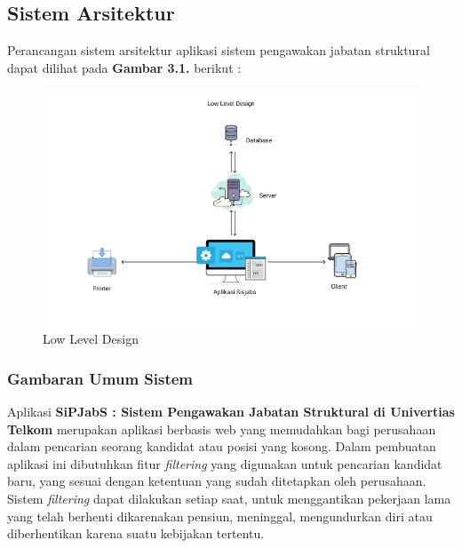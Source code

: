 \chapter{\babTiga}

\section{Sistem Arsitektur}

Perancangan sistem arsitektur aplikasi sistem pengawakan jabatan struktural dapat dilihat pada \textbf{Gambar 3.1.} berikut : 

\begin{figure}
	\centering
	\includegraphics[width=1\textwidth]
	{pics/LowLevelDiagram.png}
	\caption{Low Level Design}
	\label{fig:31}
\end{figure}


\subsection{Gambaran Umum Sistem}

Aplikasi \textbf{SiPJabS : Sistem Pengawakan Jabatan Struktural di Univertias Telkom} merupakan aplikasi berbasis web yang memudahkan bagi perusahaan dalam pencarian seorang kandidat atau posisi yang kosong. Dalam pembuatan aplikasi ini dibutuhkan fitur \textit{filtering} yang digunakan untuk pencarian kandidat baru, yang sesuai dengan ketentuan yang sudah ditetapkan oleh perusahaan. Sistem \textit{filtering} dapat dilakukan setiap saat, untuk menggantikan pekerjaan lama yang telah berhenti dikarenakan pensiun, meninggal, mengundurkan diri atau diberhentikan karena suatu kebijakan tertentu. \\

